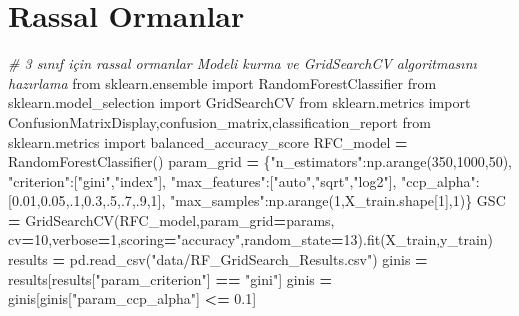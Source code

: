 \documentclass[12pt,twoside]{deuthesis}
\newenvironment{Shaded}{\begin{snugshade}}{\end{snugshade}}
\newcommand{\CommentTok}[1]{\textcolor[rgb]{0.56,0.35,0.01}{\textit{#1}}}
\newcommand{\DecValTok}[1]{\textcolor[rgb]{0.00,0.00,0.81}{#1}}
\newcommand{\FloatTok}[1]{\textcolor[rgb]{0.00,0.00,0.81}{#1}}
\newcommand{\ImportTok}[1]{#1}
\newcommand{\NormalTok}[1]{#1}
\newcommand{\OperatorTok}[1]{\textcolor[rgb]{0.81,0.36,0.00}{\textbf{#1}}}
\newcommand{\StringTok}[1]{\textcolor[rgb]{0.31,0.60,0.02}{#1}}
\begin{document}
\hypertarget{rassal-ormanlar}{%
\section{Rassal Ormanlar}\label{rassal-ormanlar}}

\scriptsize
\begin{Shaded}
\begin{Highlighting}[]
\CommentTok{\# 3 sınıf için rassal ormanlar Modeli kurma ve GridSearchCV algoritmasını hazırlama}
\ImportTok{from}\NormalTok{ sklearn.ensemble }\ImportTok{import}\NormalTok{ RandomForestClassifier}
\ImportTok{from}\NormalTok{ sklearn.model\_selection }\ImportTok{import}\NormalTok{ GridSearchCV}
\ImportTok{from}\NormalTok{ sklearn.metrics }\ImportTok{import}\NormalTok{ ConfusionMatrixDisplay,confusion\_matrix,classification\_report}
\ImportTok{from}\NormalTok{ sklearn.metrics }\ImportTok{import}\NormalTok{ balanced\_accuracy\_score}
\NormalTok{RFC\_model }\OperatorTok{=}\NormalTok{ RandomForestClassifier()}
\NormalTok{param\_grid }\OperatorTok{=}\NormalTok{ \{}\StringTok{"n\_estimators"}\NormalTok{:np.arange(}\DecValTok{350}\NormalTok{,}\DecValTok{1000}\NormalTok{,}\DecValTok{50}\NormalTok{),}
              \StringTok{"criterion"}\NormalTok{:[}\StringTok{"gini"}\NormalTok{,}\StringTok{"index"}\NormalTok{],}
              \StringTok{"max\_features"}\NormalTok{:[}\StringTok{"auto"}\NormalTok{,}\StringTok{"sqrt"}\NormalTok{,}\StringTok{"log2"}\NormalTok{],}
              \StringTok{"ccp\_alpha"}\NormalTok{:[}\FloatTok{0.01}\NormalTok{,}\FloatTok{0.05}\NormalTok{,}\FloatTok{.1}\NormalTok{,}\FloatTok{0.3}\NormalTok{,}\FloatTok{.5}\NormalTok{,}\FloatTok{.7}\NormalTok{,}\FloatTok{.9}\NormalTok{,}\DecValTok{1}\NormalTok{],}
              \StringTok{"max\_samples"}\NormalTok{:np.arange(}\DecValTok{1}\NormalTok{,X\_train.shape[}\DecValTok{1}\NormalTok{],}\DecValTok{1}\NormalTok{)\}}
\NormalTok{GSC }\OperatorTok{=}\NormalTok{ GridSearchCV(RFC\_model,param\_grid}\OperatorTok{=}\NormalTok{params,}
\NormalTok{                   cv}\OperatorTok{=}\DecValTok{10}\NormalTok{,verbose}\OperatorTok{=}\DecValTok{1}\NormalTok{,scoring}\OperatorTok{=}\StringTok{"accuracy"}\NormalTok{,random\_state}\OperatorTok{=}\DecValTok{13}\NormalTok{).fit(X\_train,y\_train)}
\NormalTok{results }\OperatorTok{=}\NormalTok{ pd.read\_csv(}\StringTok{"data/RF\_GridSearch\_Results.csv"}\NormalTok{)}
\NormalTok{ginis }\OperatorTok{=}\NormalTok{ results[results[}\StringTok{"param\_criterion"}\NormalTok{] }\OperatorTok{==} \StringTok{"gini"}\NormalTok{]}
\NormalTok{ginis }\OperatorTok{=}\NormalTok{ ginis[ginis[}\StringTok{"param\_ccp\_alpha"}\NormalTok{] }\OperatorTok{\textless{}=} \FloatTok{0.1}\NormalTok{]}

\end{Highlighting}
\end{Shaded}
\end{document}
